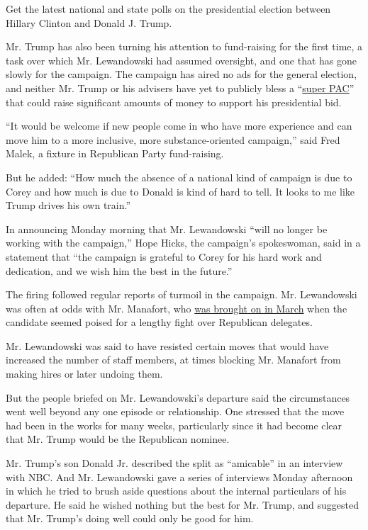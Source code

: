 Get the latest national and state polls on the presidential election
between Hillary Clinton and Donald J. Trump.

Mr. Trump has also been turning his attention to fund-raising for the
first time, a task over which Mr. Lewandowski had assumed oversight, and
one that has gone slowly for the campaign. The campaign has aired no ads
for the general election, and neither Mr. Trump or his advisers have yet
to publicly bless a
``\href{http://topics.nytimes.com/top/reference/timestopics/subjects/c/campaign_finance/index.html?inline=nyt-classifier}{super
PAC}'' that could raise significant amounts of money to support his
presidential bid.

``It would be welcome if new people come in who have more experience and
can move him to a more inclusive, more substance-oriented campaign,''
said Fred Malek, a fixture in Republican Party fund-raising.

But he added: ``How much the absence of a national kind of campaign is
due to Corey and how much is due to Donald is kind of hard to tell. It
looks to me like Trump drives his own train.''

In announcing Monday morning that Mr. Lewandowski ``will no longer be
working with the campaign,'' Hope Hicks, the campaign's spokeswoman,
said in a statement that ``the campaign is grateful to Corey for his
hard work and dedication, and we wish him the best in the future.''

The firing followed regular reports of turmoil in the campaign. Mr.
Lewandowski was often at odds with Mr. Manafort, who
\href{http://www.nytimes.com/politics/first-draft/2016/03/28/donald-trump-hires-paul-manafort-to-lead-delegate-effort/}{was
brought on in March} when the candidate seemed poised for a lengthy
fight over Republican delegates.

Mr. Lewandowski was said to have resisted certain moves that would have
increased the number of staff members, at times blocking Mr. Manafort
from making hires or later undoing them.

But the people briefed on Mr. Lewandowski's departure said the
circumstances went well beyond any one episode or relationship. One
stressed that the move had been in the works for many weeks,
particularly since it had become clear that Mr. Trump would be the
Republican nominee.

Mr. Trump's son Donald Jr. described the split as ``amicable'' in an
interview with NBC. And Mr. Lewandowski gave a series of interviews
Monday afternoon in which he tried to brush aside questions about the
internal particulars of his departure. He said he wished nothing but the
best for Mr. Trump, and suggested that Mr. Trump's doing well could only
be good for him.

